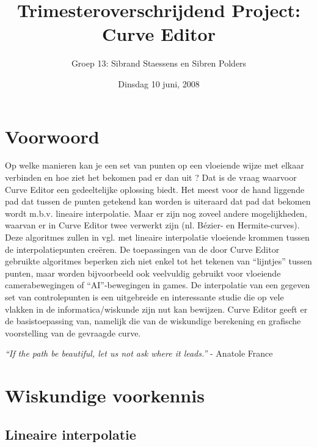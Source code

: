 \documentclass[a4paper,11pt,oneside, titlepage]{article}
\author{Groep 13: Sibrand Staessens en Sibren Polders}
\title{Trimesteroverschrijdend Project: Curve Editor}
\date{Dinsdag 10 juni, 2008}
\begin{document}
\maketitle \newpage
\tableofcontents \newpage
\section{Voorwoord}
Op welke manieren kan je een set van punten op een vloeiende wijze met elkaar verbinden en hoe ziet het bekomen pad er dan uit ? Dat is
de vraag waarvoor Curve Editor een gedeeltelijke oplossing biedt. Het meest voor de hand liggende pad dat tussen de punten getekend kan worden 
is uiteraard dat pad dat bekomen wordt m.b.v. lineaire interpolatie. Maar er zijn nog zoveel andere mogelijkheden, waarvan er in Curve Editor twee verwerkt 
zijn (nl. B\'ezier- en Hermite-curves). Deze algoritmes zullen in vgl. met lineaire interpolatie vloeiende krommen
tussen de interpolatiepunten cre\"eren. De toepassingen van de door Curve Editor gebruikte algoritmes beperken zich niet enkel 
tot het tekenen van ``lijntjes'' tussen punten, maar worden bijvoorbeeld ook veelvuldig gebruikt voor vloeiende camerabewegingen of ``AI''-bewegingen in games.
De interpolatie van een gegeven set van controlepunten is een uitgebreide en interessante studie die 
op vele vlakken in de informatica/wiskunde zijn nut kan bewijzen. Curve Editor geeft er de 
basistoepassing van, namelijk die van de wiskundige berekening en grafische voorstelling van de gevraagde curve. \newline \newline \newline \newline
\newline \newline \newline \newline
\begin{center}
\textit{``If the path be beautiful, let us not ask where it leads.''} - Anatole France \newpage
\end{center}
\newpage
\section{Wiskundige voorkennis\label{swv}}
\subsection{Lineaire interpolatie \label{sli}}
\end{document}
